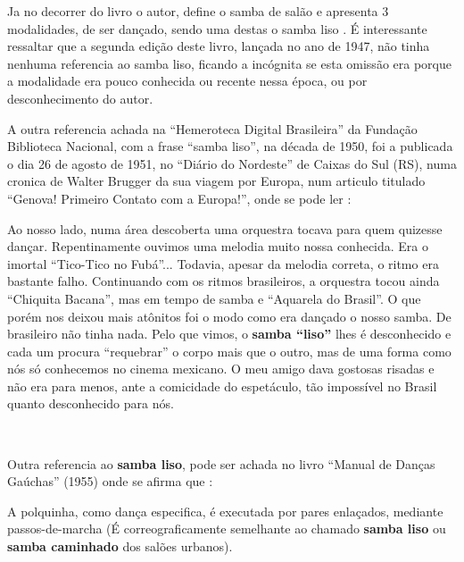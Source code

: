 Ja no decorrer do livro o autor, define o samba de salão e apresenta 3 modalidades,
de ser dançado, sendo uma destas o samba liso \cite[pp. 61]{fornaciari1950aprender}.
É interessante ressaltar que a segunda edição deste livro, lançada no ano de 1947,
não tinha nenhuma referencia ao samba liso, ficando a incógnita se esta omissão era
porque a modalidade era pouco conhecida ou recente nessa época, ou por desconhecimento do autor.



A outra referencia achada na ``Hemeroteca Digital Brasileira'' da Fundação Biblioteca Nacional,
com a frase ``samba liso'', na década de 1950, foi a publicada o dia 26 de agosto de 1951,
no ``Diário do Nordeste'' de Caixas do Sul (RS), numa cronica de Walter Brugger da sua viagem por Europa,
num articulo titulado ``Genova! Primeiro Contato com a Europa!'',
onde se pode ler \cite[pp. 10]{nordestesambalisocronica}:
\begin{citando}
Ao nosso lado, numa área 
descoberta uma orquestra tocava para
quem quizesse dançar.
Repentinamente ouvimos uma melodia muito
nossa conhecida. Era o imortal ``Tico-Tico no Fubá''... Todavia,
apesar da melodia correta, o ritmo
era bastante falho. Continuando 
com os ritmos brasileiros, a orquestra 
tocou ainda ``Chiquita Bacana'',
mas em tempo de samba e ``Aquarela do Brasil''.
O que porém nos 
deixou mais atônitos foi o modo como 
era dançado o nosso samba. De 
brasileiro não tinha nada. Pelo que 
vimos, o \textbf{samba ``liso''} lhes é desconhecido 
e cada um procura ``requebrar'' o corpo mais que o outro,
mas de uma forma como nós só 
conhecemos no cinema mexicano. 
O meu amigo dava gostosas risadas e não era para menos,
ante a comicidade do espetáculo, tão 
impossível no Brasil quanto desconhecido para nós.
\end{citando}~\\



Outra referencia ao \textbf{samba liso}, pode ser achada no livro ``Manual de Danças Gaúchas'' (1955)
onde se afirma que \cite[pp. 77]{cortesmanual}: 
\begin{citando}
A polquinha, como dança especifica, é executada por pares enlaçados,
mediante passos-de-marcha (É correograficamente  semelhante ao chamado 
\textbf{samba liso} ou \textbf{samba caminhado} dos salões urbanos).
\end{citando}~\\


